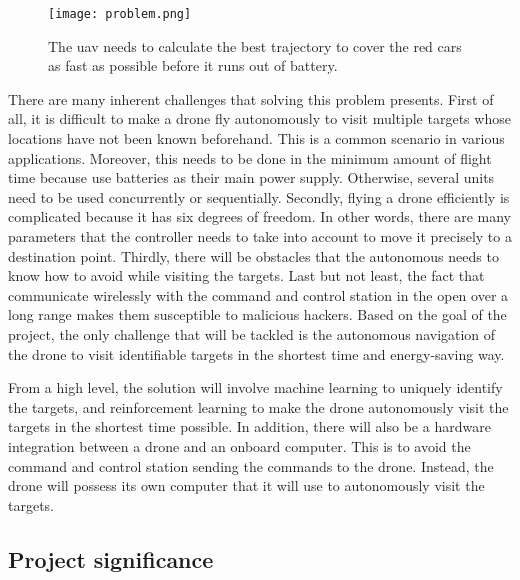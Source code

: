 \documentclass[../main.tex]{subfiles}
\begin{document}
\begin{figure}[tb] 
    \centering
    \texttt{[image: problem.png]} 
    \caption{The \gls{uav} needs to calculate 
    the best trajectory to cover the red cars
    as fast as possible before it runs out of battery.} 
    \label{fig:problem} 
\end{figure}

There are many inherent challenges that solving this problem
presents. First of all, it is difficult to make a drone
fly autonomously to visit multiple targets whose locations
have not been known beforehand. 
This is a common scenario in various applications. 
Moreover, this needs to be done in the minimum
amount of flight time because \uavs use batteries
as their main power supply.
Otherwise, several units need to be used concurrently
or sequentially.
Secondly, flying a drone efficiently is complicated 
because it has six degrees of freedom. In other words, 
there are many parameters that the controller needs to 
take into account to move 
it precisely to a destination point. 
Thirdly, there will be obstacles that the autonomous \uav
needs to know how to avoid while visiting the targets.
Last but not least, the fact that \uavs communicate wirelessly
with the command and control station in the open 
over a long range makes them susceptible
to malicious hackers.
Based on the goal of the project, the only challenge 
that will be tackled is the autonomous navigation
of the drone to visit identifiable targets in the shortest
time and energy-saving way.

From a high level, the solution will involve machine learning
to uniquely identify the targets, and reinforcement learning
to make the drone autonomously visit the targets in the
shortest time possible. In addition, there will also be
a hardware integration between a drone and an onboard
computer. This is to avoid the command and control
station sending the commands to the drone. Instead, the drone
will possess its own computer that it will use to 
autonomously visit the targets.

\subsection{Project significance}
\end{document}
